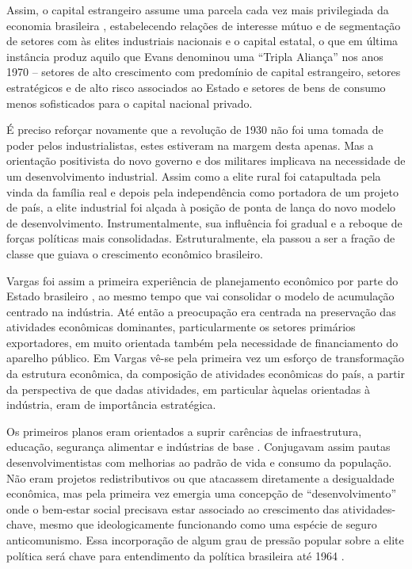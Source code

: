 Assim, o capital estrangeiro assume uma parcela cada vez mais
privilegiada da economia brasileira \citep{pradojunior2012}, estabelecendo relações de
interesse mútuo e de segmentação de setores com
às elites industriais nacionais e o capital estatal, o que em última instância
produz aquilo que Evans\citep{evans_dependent_1979} 
denominou uma ``Tripla Aliança'' nos anos 1970 -- setores de
alto crescimento com predomínio de capital estrangeiro, setores
estratégicos e de alto risco associados ao Estado e setores de bens de
consumo menos sofisticados para o capital nacional privado.

É preciso reforçar novamente que a revolução de 1930 não foi uma tomada de poder
pelos industrialistas, estes estiveram na margem desta apenas.
Mas a orientação positivista do novo governo \citep{perissinotto_ideias_2023} e dos
militares implicava na necessidade de um desenvolvimento
industrial. Assim como a elite rural foi catapultada pela vinda da
família real e depois pela independência como portadora de um projeto de
país, a elite industrial foi alçada à posição de ponta de lança do novo
modelo de desenvolvimento. Instrumentalmente, sua influência foi gradual
e a reboque de forças políticas mais consolidadas. Estruturalmente, ela
passou a ser a fração de classe que guiava o crescimento econômico
brasileiro.

Vargas foi assim a primeira experiência de planejamento econômico por
parte do Estado brasileiro \citet[]{kon_quatro_1994}, ao mesmo tempo que vai consolidar o
modelo de acumulação centrado na indústria. Até então a preocupação era
centrada na preservação das atividades econômicas dominantes,
particularmente os setores primários exportadores, em muito orientada
também pela necessidade de financiamento do aparelho público. Em Vargas
vê-se pela primeira vez um esforço de transformação da estrutura
econômica, da composição de atividades econômicas do país, a partir da
perspectiva de que dadas atividades, em particular àquelas orientadas à
indústria, eram de importância estratégica.

Os primeiros planos eram orientados a suprir carências de
infraestrutura, educação, segurança alimentar e indústrias de base
\citet[]{kon_quatro_1994}. Conjugavam assim pautas desenvolvimentistas com melhorias ao
padrão de vida e consumo da população. Não eram projetos redistributivos
ou que atacassem diretamente a desigualdade econômica, mas pela primeira
vez emergia uma concepção de ``desenvolvimento'' onde o bem-estar social
precisava estar associado ao crescimento das atividades-chave, mesmo que
ideologicamente funcionando como uma espécie de seguro anticomunismo. Essa
incorporação de algum grau de pressão popular sobre a elite política será
chave para entendimento da política brasileira até 1964 \citep[]{weffortPopulismoNaPolitica2003}.

